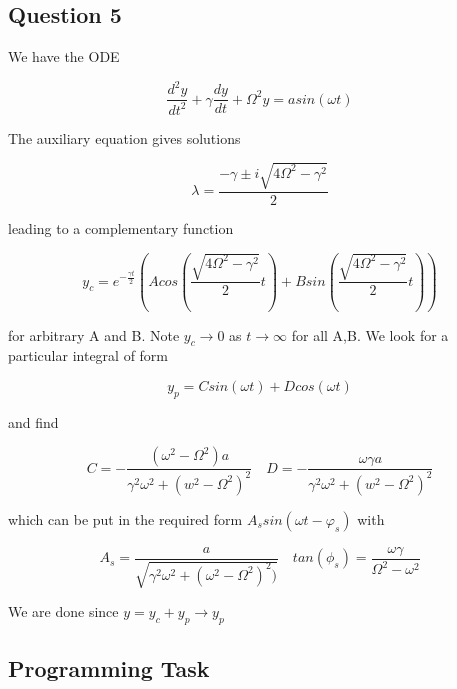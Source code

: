 \documentclass[10pt,a4paper]{report}
\begin{document}
\newpage

\subsection*{Question 5}

We have the ODE

\begin{equation*}
\frac{d^2y}{dt^2} + \gamma\frac{dy}{dt}+\Omega^2y=asin(\omega t)
\end{equation*}

The auxiliary equation gives solutions 

\begin{equation*}
\lambda = \frac{- \gamma \pm i \sqrt{4 \Omega ^2 - \gamma ^2}}{2}
\end{equation*}

leading to a complementary function 

\begin{equation*}
y_c=e^{-\frac{\gamma t}{2}}(Acos(\frac{\sqrt{4 \Omega ^2 - \gamma ^2}}{2}t)+Bsin(\frac{\sqrt{4 \Omega ^2 - \gamma ^2}}{2}t))
\end{equation*}

for arbitrary A and B. Note $y_c \rightarrow 0$ as $t\rightarrow\infty$ for all A,B. We look for a particular integral of form

\begin{equation*}
y_p=Csin(\omega t) + Dcos(\omega t)
\end{equation*}

and find

\begin{equation*}
C=-\frac{(\omega^2-\Omega^2)a}{\gamma^2\omega^2+(w^2-\Omega^2)^2}
\quad
D=-\frac{\omega\gamma a}{\gamma^2\omega^2+(w^2-\Omega^2)^2}
\end{equation*}

which can be put in the required form $ A_s sin(\omega t - \varphi_s)$ with

\begin{equation*}
A_s = \frac{a}{\sqrt{\gamma^2\omega^2+(\omega^2-\Omega^2)^2)}}
\quad
tan(\phi _s) = \frac{\omega\gamma}{\Omega^2-\omega^2}
\end{equation*}

We are done since $y=y_c+y_p\rightarrow y_p$

\subsection*{Programming Task}
\end{document}
